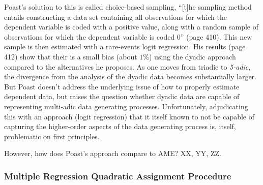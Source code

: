 Poast's solution to this is called choice-based sampling, ``[t]he sampling method entails constructing a data set containing all observations for which the dependent variable is coded with a positive value, along with a random sample of observations for which the dependent variable is coded 0'' (page 410). This new sample is then estimated with a rare-events logit regression. His results (page 412) show that their is a small bias (about $1\%$) using the dyadic approach compared to the alternatives he proposes.  As one moves from triadic to \textit{5-adic}, the divergence from the analysis of the dyadic data becomes substantially larger. But Poast doesn't address the underlying issue of how to properly estimate dependent data, but raises the question whether dyadic data are capable of representing multi-adic data generating processes.  Unfortunately, adjudicating this with an approach (logit regression) that it itself known to not be capable of capturing the higher-order aspects of the data generating process is, itself, problematic on first principles.  

However, how does Poast's approach compare to AME?  XX, YY, ZZ.





\subsubsection*{Multiple Regression Quadratic Assignment Procedure}

